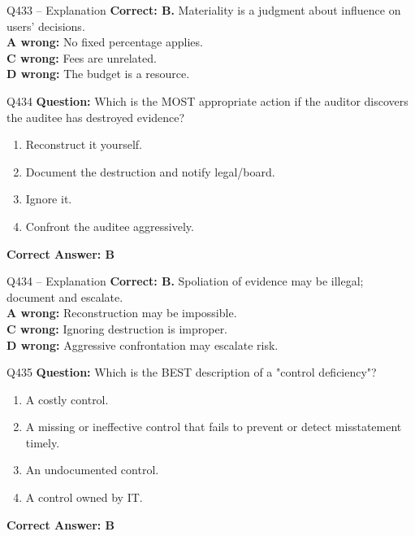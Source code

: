 \documentclass[aspectratio=169,10pt]{beamer}
\begin{document}
	\begin{frame}[t]{Q433 -- Explanation}
		\small
		\textbf{Correct: B.} Materiality is a judgment about influence on users' decisions. \\[4pt]
		\textbf{A wrong:} No fixed percentage applies. \\[2pt]
		\textbf{C wrong:} Fees are unrelated. \\[2pt]
		\textbf{D wrong:} The budget is a resource.
	\end{frame}
	
	\begin{frame}[t]{Q434}
		\small
		\textbf{Question:} Which is the MOST appropriate action if the auditor discovers the auditee has destroyed evidence?
		\begin{enumerate}[label=\Alph*.,itemsep=1pt,topsep=2pt]
			\item Reconstruct it yourself.
			\item Document the destruction and notify legal/board.
			\item Ignore it.
			\item Confront the auditee aggressively.
		\end{enumerate}
		\vspace{4pt}
		\textbf{Correct Answer: B}
	\end{frame}
	
	\begin{frame}[t]{Q434 -- Explanation}
		\small
		\textbf{Correct: B.} Spoliation of evidence may be illegal; document and escalate. \\[4pt]
		\textbf{A wrong:} Reconstruction may be impossible. \\[2pt]
		\textbf{C wrong:} Ignoring destruction is improper. \\[2pt]
		\textbf{D wrong:} Aggressive confrontation may escalate risk.
	\end{frame}
	
	\begin{frame}[t]{Q435}
		\small
		\textbf{Question:} Which is the BEST description of a "control deficiency"?
		\begin{enumerate}[label=\Alph*.,itemsep=1pt,topsep=2pt]
			\item A costly control.
			\item A missing or ineffective control that fails to prevent or detect misstatement timely.
			\item An undocumented control.
			\item A control owned by IT.
		\end{enumerate}
		\vspace{4pt}
		\textbf{Correct Answer: B}
	\end{frame}
	
\end{document}
